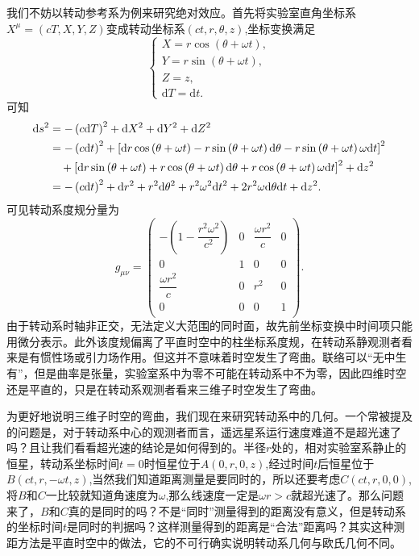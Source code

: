 \documentclass[11pt, a4paper, oneside, onecolumn]{ctexart}
\numberwithin{equation}{subsection}
\begin{document}
我们不妨以转动参考系为例来研究绝对效应。首先将实验室直角坐标系$X^{\mu}=\left(cT,X,Y,Z\right)$变成转动坐标系$\left(ct,r,\theta,z\right)$,坐标变换满足
\begin{equation}
\begin{cases}
X=r\cos\left(\theta+\omega t\right),\\
Y=r\sin\left(\theta+\omega t\right),\\
Z=z,\\
\mathrm{d}T=\mathrm{d}t.
\end{cases}
\end{equation}
可知
\begin{align}
\mathrm{d}s^{2}&=-\left(c\mathrm{d}T\right)^{2}+\mathrm{d}X^{2}+\mathrm{d}Y^{2}+\mathrm{d}Z^{2}\notag\\
&=-\left(c\mathrm{d}t\right)^{2}+\left[\mathrm{d}r\cos\left(\theta+\omega t\right)-r\sin\left(\theta+\omega t\right)\mathrm{d}\theta-r\sin\left(\theta+\omega t\right)\omega\mathrm{d}t\right]^{2}\notag\\
&\quad+\left[\mathrm{d}r\sin\left(\theta+\omega t\right)+r\cos\left(\theta+\omega t\right)\mathrm{d}\theta+r\cos\left(\theta+\omega t\right)\omega\mathrm{d}t\right]^{2}+\mathrm{d}z^{2}\notag\\
&=-\left(c\mathrm{d}t\right)^{2}+\mathrm{d}r^{2}+r^{2}\mathrm{d}\theta^{2}+r^{2}\omega^{2}\mathrm{d} t^{2}+2r^{2}\omega\mathrm{d}\theta\mathrm{d}t+\mathrm{d}z^{2}.
\end{align}
可见转动系度规分量为
\begin{equation}
g_{\mu\nu}=\begin{pmatrix}
-\left(1-\dfrac{r^{2}\omega^{2}}{c^{2}}\right) & 0 & \dfrac{\omega r^{2}}{c} & 0\\
0 & 1 & 0 & 0\\
\dfrac{\omega r^{2}}{c} & 0 & r^{2} & 0\\
0 & 0 & 0 & 1\\
\end{pmatrix}.
\end{equation}
由于转动系时轴非正交，无法定义大范围的同时面，故先前坐标变换中时间项只能用微分表示。此外该度规偏离了平直时空中的柱坐标系度规，在转动系静观测者看来是有惯性场或引力场作用。但这并不意味着时空发生了弯曲。联络可以“无中生有”，但是曲率是张量，实验室系中为零不可能在转动系中不为零，因此四维时空还是平直的，只是在转动系观测者看来三维子时空发生了弯曲。

为更好地说明三维子时空的弯曲，我们现在来研究转动系中的几何。一个常被提及的问题是，对于转动系中心的观测者而言，遥远星系运行速度难道不是超光速了吗？且让我们看看超光速的结论是如何得到的。半径$r$处的，相对实验室系静止的恒星，转动系坐标时间$t=0$时恒星位于$A\left(0,r,0,z\right)$,经过时间$t$后恒星位于$B\left(ct,r,-\omega t,z\right)$,当然我们知道距离测量是要同时的，所以还要考虑$C\left(ct,r,0,0\right)$,将$B$和$C$一比较就知道角速度为$\omega$,那么线速度一定是$\omega r>c$就超光速了。那么问题来了，$B$和$C$真的是同时的吗？不是“同时”测量得到的距离没有意义，但是转动系的坐标时间$t$是同时的判据吗？这样测量得到的距离是“合法”距离吗？其实这种测距方法是平直时空中的做法，它的不可行确实说明转动系几何与欧氏几何不同。
\end{document}

